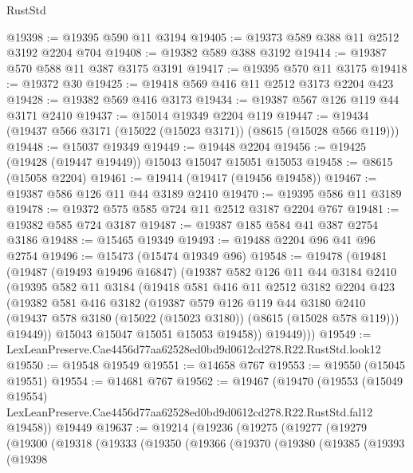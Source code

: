 \begin{lexlean}{RustStd}
\begin{coremodule}
@19398 := @19395 @590 @11 @3194
@19405 := @19373 @589 @388 @11 @2512 @3192 @2204 @704
@19408 := @19382 @589 @388 @3192
@19414 := @19387 @570 @588 @11 @387 @3175 @3191
@19417 := @19395 @570 @11 @3175
@19418 := @19372 @30
@19425 := @19418 @569 @416 @11 @2512 @3173 @2204 @423
@19428 := @19382 @569 @416 @3173
@19434 := @19387 @567 @126 @119 @44 @3171 @2410
@19437 := @15014 @19349 @2204 @119
@19447 := @19434 (@19437 @566 @3171 (@15022 (@15023 @3171)) (@8615 (@15028 @566 @119)))
@19448 := @15037 @19349
@19449 := @19448 @2204
@19456 := @19425 (@19428 (@19447 @19449)) @15043 @15047 @15051 @15053
@19458 := @8615 (@15058 @2204)
@19461 := @19414 (@19417 (@19456 @19458))
@19467 := @19387 @586 @126 @11 @44 @3189 @2410
@19470 := @19395 @586 @11 @3189
@19478 := @19372 @575 @585 @724 @11 @2512 @3187 @2204 @767
@19481 := @19382 @585 @724 @3187
@19487 := @19387 @185 @584 @41 @387 @2754 @3186
@19488 := @15465 @19349
@19493 := @19488 @2204 @96 @41 @96 @2754
@19496 := @15473 (@15474 @19349 @96)
@19548 := @19478
    (@19481
      (@19487
        (@19493 @19496 @16847)
        (@19387
          @582
          @126
          @11
          @44
          @3184
          @2410
          (@19395
            @582
            @11
            @3184
            (@19418
              @581
              @416
              @11
              @2512
              @3182
              @2204
              @423
              (@19382
                @581
                @416
                @3182
                (@19387
                  @579
                  @126
                  @119
                  @44
                  @3180
                  @2410
                  (@19437 @578 @3180 (@15022 (@15023 @3180)) (@8615 (@15028 @578 @119)))
                  @19449))
              @15043
              @15047
              @15051
              @15053
              @19458))
          @19449)))
@19549 := LexLeanPreserve.Cae4456d77aa62528ed0bd9d0612cd278.R22.RustStd.look12
@19550 := @19548 @19549
@19551 := @14658 @767
@19553 := @19550 (@15045 @19551)
@19554 := @14681 @767
@19562 := @19467
    (@19470
      (@19553
        (@15049 @19554)
        LexLeanPreserve.Cae4456d77aa62528ed0bd9d0612cd278.R22.RustStd.fal12
        @19458))
    @19449
@19637 := @19214
    (@19236
      (@19275
        (@19277
          (@19279
            (@19300
              (@19318
                (@19333
                  (@19350
                    (@19366
                      (@19370
                        (@19380
                          (@19385
                            (@19393
                              (@19398

\end{coremodule}
\end{lexlean}
